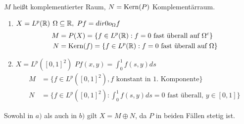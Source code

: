 \begin{vereinbarung}
	$M$ hei{\ss}t komplementierter Raum, $N = \mathop{\rm Kern}\nolimits(P)$ Komplementärraum.
\end{vereinbarung}


\begin{beispiel*}
	\begin{enumerate}[label=\alph*\upshape)]
		\item $X = L^{p}(\mathbb{R})$ $\Omega \subseteq \mathbb{R},$ $P f = \1_{\Omega} f$
			\begin{align*}
				M & = P(X) = \{ f \in L^{p}(\mathbb{R}): f = 0 \text{ fast überall auf } \Omega^{c} \} \\
				N & = \mathop{\rm Kern}\nolimits(f) = \{ f \in L^{p}(\mathbb{R}): f = 0 \text{ fast überall auf } \Omega \}
			\end{align*} 
		\item $X = L^{p}([0, 1]^{2})$ $P f(x, y) = \int_{0}^{1} f(s, y) ds$
			\begin{align*}
				M & = \{ f \in L^{p}([0, 1]^{2}), f \text{ konstant in 1. Komponente} \} \\
				N & = \{ f \in L^{p}([0, 1]^{2}): \int_{0}^{1} f(s, y) ds = 0 \text{ fast überall, } y \in [0, 1] \}
			\end{align*}
	\end{enumerate}
	Sowohl in $a)$ als auch in $b)$ gilt $X = M \oplus N$, da $P$ in beiden Fällen stetig ist.
\end{beispiel*}



\newpage